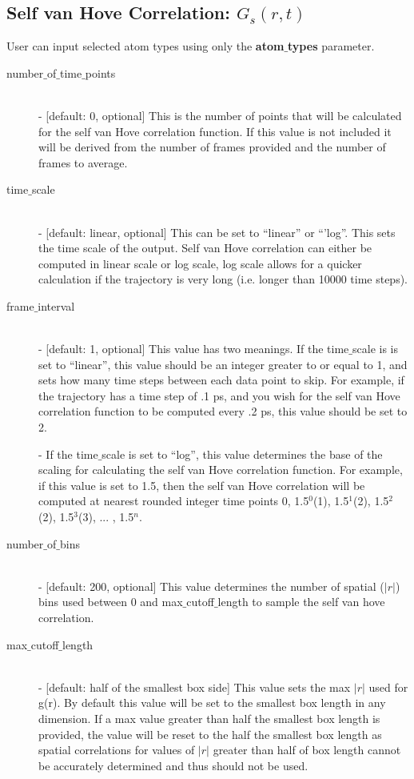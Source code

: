 \documentclass{article}
\begin{document}
\subsection{Self van Hove Correlation: $G_s(r,t)$} \label{sec::Gofrt_parm}
User can input selected atom types using only the \textbf{atom$\_$types} parameter.
\begin{description}	
	\item[number$\_$of$\_$time$\_$points]\hfill \\
	- [default: 0, optional] This is the number of points that will be calculated for the self van Hove correlation function.  If this value is not included it will be derived from the number of frames provided and the number of frames to average.
	
	\item[time$\_$scale] \hfill \\
	- [default: linear, optional] This can be set to ``linear'' or ``'log''.  This sets the time scale of the output. Self van Hove correlation can either be computed in linear scale or log scale, log scale allows for a quicker calculation if the trajectory is very long (i.e. longer than 10000 time steps).
	
	\item[frame$\_$interval] \hfill \\
	- [default: 1, optional] This value has two meanings.  If the time$\_$scale is is set to ``linear'', this value should be an integer greater to or equal to 1, and sets how many time steps between each data point to skip.  For example, if the trajectory has a time step of .1 ps, and you wish for the self van Hove correlation function to be computed every .2 ps, this value should be set to 2. 
	
	- If the time$\_$scale is set to ``log'', this value determines the base of the scaling for calculating the self van Hove correlation function.   For example, if this value is set to 1.5, then the self van Hove correlation will be computed at nearest rounded integer time points 0, 1.5$^0$(1), 1.5$^1$(2), 1.5$^2$(2), 1.5$^3$(3), ... , 1.5$^{n}$.
	
	\item[number$\_$of$\_$bins] \hfill \\
	- [default: 200, optional] This value determines the number of spatial ($|r|$) bins used between 0 and max$\_$cutoff$\_$length to sample the self van hove correlation.
	
	\item[max$\_$cutoff$\_$length] \hfill \\
	- [default: half of the smallest box side] This value sets the max $|r|$ used for g(r).  By default this value will be set to the smallest box length in any dimension.  If a max value greater than half the smallest box length is provided, the value will be reset to the half the smallest box length as spatial correlations for values of $|r|$ greater than half of box length cannot be accurately determined and thus should not be used.
\end{description}
\end{document}
